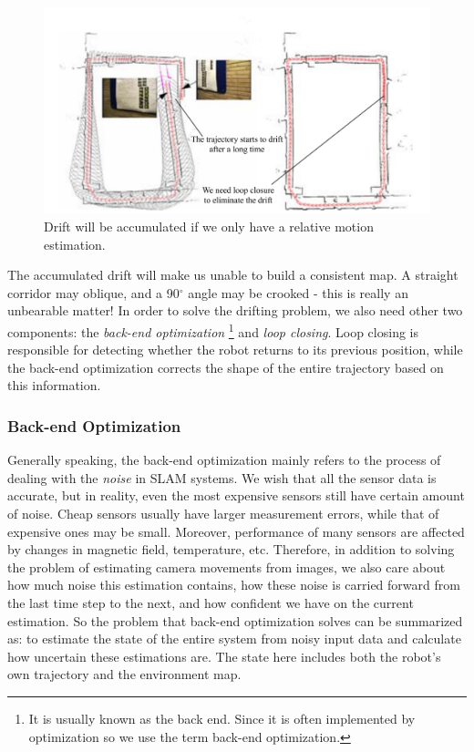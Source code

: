 \begin{figure}
    \centering
    \includegraphics[width=1.0\textwidth]{./resources/whatIsSLAM/loopclosure.pdf}
    \caption{Drift will be accumulated if we only have a relative motion estimation.}
    \label{fig:loopclosure}
\end{figure}

The accumulated drift will make us unable to build a consistent map. A straight corridor may oblique, and a 90$^\circ$ angle may be crooked - this is really an unbearable matter! In order to solve the drifting problem, we also need other two components: the \emph{back-end optimization} \footnote{It is usually known as the back end. Since it is often implemented by optimization so we use the term back-end optimization.} and \emph{loop closing}. Loop closing is responsible for detecting whether the robot returns to its previous position, while the back-end optimization corrects the shape of the entire trajectory based on this information.


\subsubsection{ Back-end Optimization}
Generally speaking, the back-end optimization mainly refers to the process of dealing with the \emph{noise} in SLAM systems. We wish that all the sensor data is accurate, but in reality, even the most expensive sensors still have certain amount of noise. Cheap sensors usually have larger measurement errors, while that of expensive ones may be small. Moreover, performance of many sensors are affected by changes in magnetic field, temperature, etc. Therefore, in addition to solving the problem of estimating camera movements from images, we also care about how much noise this estimation contains, how these noise is carried forward from the last time step to the next, and how confident we have on the current estimation. So the problem that back-end optimization solves can be summarized as: to estimate the state of the entire system from noisy input data and calculate how uncertain these estimations are. The state here includes both the robot's own trajectory and the environment map.

